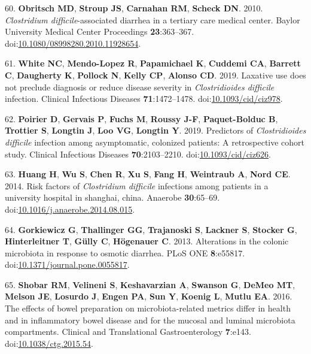 \documentclass[
  11pt,
]{article}
\begin{document}
\leavevmode\hypertarget{ref-Obritsch2010}{}%
60. \textbf{Obritsch MD}, \textbf{Stroup JS}, \textbf{Carnahan RM},
\textbf{Scheck DN}. 2010. \emph{Clostridium difficile}-associated
diarrhea in a tertiary care medical center. Baylor University Medical
Center Proceedings \textbf{23}:363--367.
doi:\href{https://doi.org/10.1080/08998280.2010.11928654}{10.1080/08998280.2010.11928654}.

\leavevmode\hypertarget{ref-White2019}{}%
61. \textbf{White NC}, \textbf{Mendo-Lopez R}, \textbf{Papamichael K},
\textbf{Cuddemi CA}, \textbf{Barrett C}, \textbf{Daugherty K},
\textbf{Pollock N}, \textbf{Kelly CP}, \textbf{Alonso CD}. 2019.
Laxative use does not preclude diagnosis or reduce disease severity in
\emph{Clostridioides difficile} infection. Clinical Infectious Diseases
\textbf{71}:1472--1478.
doi:\href{https://doi.org/10.1093/cid/ciz978}{10.1093/cid/ciz978}.

\leavevmode\hypertarget{ref-Poirier2019}{}%
62. \textbf{Poirier D}, \textbf{Gervais P}, \textbf{Fuchs M},
\textbf{Roussy J-F}, \textbf{Paquet-Bolduc B}, \textbf{Trottier S},
\textbf{Longtin J}, \textbf{Loo VG}, \textbf{Longtin Y}. 2019.
Predictors of \emph{Clostridioides difficile} infection among
asymptomatic, colonized patients: A retrospective cohort study. Clinical
Infectious Diseases \textbf{70}:2103--2210.
doi:\href{https://doi.org/10.1093/cid/ciz626}{10.1093/cid/ciz626}.

\leavevmode\hypertarget{ref-Huang2014}{}%
63. \textbf{Huang H}, \textbf{Wu S}, \textbf{Chen R}, \textbf{Xu S},
\textbf{Fang H}, \textbf{Weintraub A}, \textbf{Nord CE}. 2014. Risk
factors of \emph{Clostridium difficile} infections among patients in a
university hospital in shanghai, china. Anaerobe \textbf{30}:65--69.
doi:\href{https://doi.org/10.1016/j.anaerobe.2014.08.015}{10.1016/j.anaerobe.2014.08.015}.

\leavevmode\hypertarget{ref-Gorkiewicz2013}{}%
64. \textbf{Gorkiewicz G}, \textbf{Thallinger GG}, \textbf{Trajanoski
S}, \textbf{Lackner S}, \textbf{Stocker G}, \textbf{Hinterleitner T},
\textbf{Gülly C}, \textbf{Högenauer C}. 2013. Alterations in the colonic
microbiota in response to osmotic diarrhea. PLoS ONE \textbf{8}:e55817.
doi:\href{https://doi.org/10.1371/journal.pone.0055817}{10.1371/journal.pone.0055817}.

\leavevmode\hypertarget{ref-Shobar2016}{}%
65. \textbf{Shobar RM}, \textbf{Velineni S}, \textbf{Keshavarzian A},
\textbf{Swanson G}, \textbf{DeMeo MT}, \textbf{Melson JE},
\textbf{Losurdo J}, \textbf{Engen PA}, \textbf{Sun Y}, \textbf{Koenig
L}, \textbf{Mutlu EA}. 2016. The effects of bowel preparation on
microbiota-related metrics differ in health and in inflammatory bowel
disease and for the mucosal and luminal microbiota compartments.
Clinical and Translational Gastroenterology \textbf{7}:e143.
doi:\href{https://doi.org/10.1038/ctg.2015.54}{10.1038/ctg.2015.54}.
\end{document}
